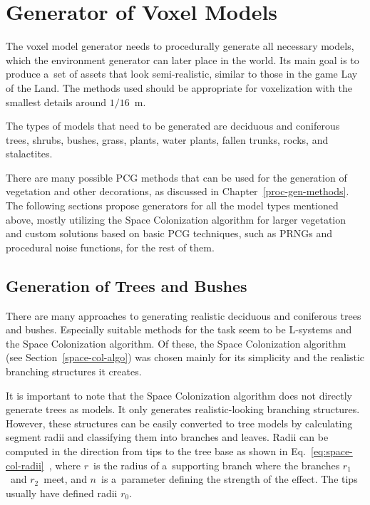 \section{Generator of Voxel Models}\label{voxel_model_generation_design}
The voxel model generator needs to procedurally generate all necessary models, which the environment generator can later place in the world. Its main goal is to produce a~set of assets that look semi-realistic, similar to those in the game Lay of the Land. The methods used should be appropriate for voxelization with the smallest details around $1/16$~m.

The types of models that need to be generated are deciduous and coniferous trees, shrubs, bushes, grass, plants, water plants, fallen trunks, rocks, and stalactites.

There are many possible PCG methods that can be used for the generation of vegetation and other decorations, as discussed in Chapter~\ref{proc-gen-methods}. The following sections propose generators for all the model types mentioned above, mostly utilizing the Space Colonization algorithm for larger vegetation and custom solutions based on basic PCG techniques, such as PRNGs and procedural noise functions, for the rest of them.

\subsection{Generation of Trees and Bushes}\label{generation_trees_bushes}

There are many approaches to generating realistic deciduous and coniferous trees and bushes. Especially suitable methods for the task seem to be L-systems and the Space Colonization algorithm. Of these, the Space Colonization algorithm (see Section~\ref{space-col-algo}) was chosen mainly for its simplicity and the realistic branching structures it creates.

It is important to note that the Space Colonization algorithm does not directly generate trees as models. It only generates realistic-looking branching structures. However, these structures can be easily converted to tree models by calculating segment radii and classifying them into branches and leaves. Radii can be computed in the direction from tips to the tree base as shown in Eq.~\ref {eq:space-col-radii}~\cite{space-colonization}, where $r$~is the radius of a~supporting branch where the branches $r_1$~and $r_2$~meet, and $n$~is a~parameter defining the strength of the effect. The tips usually have defined radii $r_0$.

